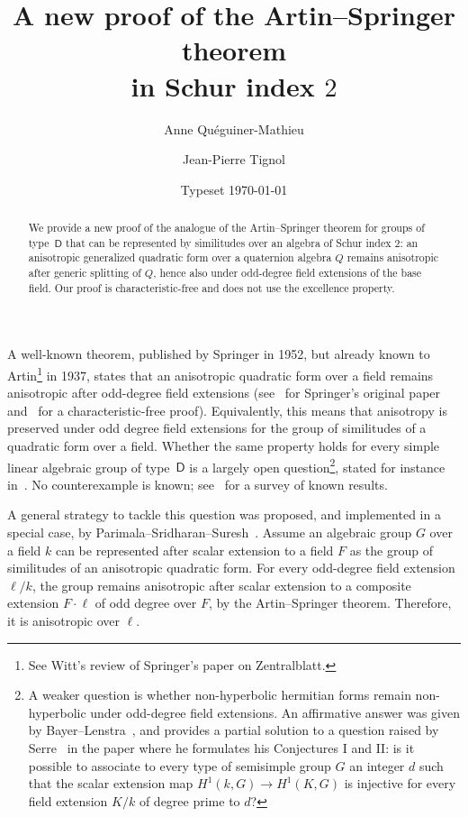 \documentclass{amsart}
\title[New proof of the Artin--Springer theorem]{A new proof of the
  Artin--Springer theorem\\ in Schur index $2$}
\author{Anne Qu\'eguiner-Mathieu}
\author{Jean-Pierre Tignol}
\date{Typeset \today}
\theoremstyle{remark}
\begin{document}
\maketitle

\begin{abstract}
We provide a new proof of the analogue of the Artin--Springer theorem
for groups of type~$\mathsf{D}$ that can be represented by similitudes over an
algebra of Schur index $2$: an anisotropic generalized quadratic form
over a quaternion algebra $Q$ remains anisotropic after generic
splitting of $Q$, hence also under odd-degree field extensions of the
base field. Our proof is characteristic-free and does not use the
excellence property.  
\end{abstract}

A well-known theorem, published by Springer in 1952, but already known
to Artin\footnote{See Witt's review of Springer's paper on
  Zentralblatt.} in 1937, states that an anisotropic quadratic 
form over a field remains anisotropic after odd-degree field
extensions (see~\cite{Sp} for Springer's original paper
and~\cite[Cor.~18.5]{EKM} for a characteristic-free
proof). Equivalently, this means that anisotropy is preserved under odd degree field extensions for the group of
similitudes of a quadratic form over a field. 
Whether the same
property holds for every simple linear algebraic group of
type~$\mathsf{D}$ 
is a largely open question\footnote{A weaker question is whether
  non-hyperbolic hermitian forms remain non-hyperbolic under
  odd-degree field extensions. An affirmative answer was given by
  Bayer--Lenstra~\cite{BL}, and provides a partial solution to a
  question raised by Serre~\cite[5.3(ii)]{Se} in the paper where he
  formulates his Conjectures I and II: is it possible to associate to
  every type of 
  semisimple group $G$ an integer $d$ such that the scalar extension
  map $H^1(k,G)\to H^1(K,G)$ is injective for every field extension
  $K/k$ of degree prime to $d$? }, stated for instance
in~\cite[\S\,7]{ABGV}. No counterexample is known; see~\cite{BQM} for
a survey of known results.

A general strategy to tackle this question was proposed, and
implemented in a special case, by
Parimala--Sridharan--Suresh~\cite{PSS}. 
Assume an algebraic group $G$ over a field $k$ can be represented after scalar extension to a field $F$ as the group of similitudes of an anisotropic quadratic form. For every odd-degree field extension $\ell/k$, the group remains anisotropic after scalar extension to a composite extension $F\cdot \ell$ of odd degree over $F$, by the Artin--Springer theorem. Therefore, it is anisotropic over $\ell$. 
\end{document}
